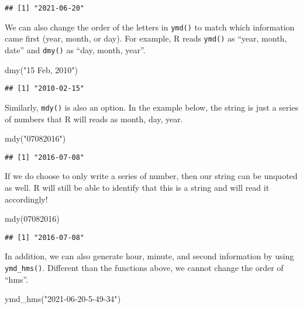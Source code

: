 \documentclass[
]{book}
\newenvironment{Shaded}{\begin{snugshade}}{\end{snugshade}}
\newcommand{\DecValTok}[1]{\textcolor[rgb]{0.00,0.00,0.81}{#1}}
\newcommand{\FunctionTok}[1]{\textcolor[rgb]{0.00,0.00,0.00}{#1}}
\newcommand{\NormalTok}[1]{#1}
\newcommand{\StringTok}[1]{\textcolor[rgb]{0.31,0.60,0.02}{#1}}
\begin{document}
\begin{verbatim}
## [1] "2021-06-20"
\end{verbatim}

We can also change the order of the letters in \texttt{ymd()} to match which information came first (year, month, or day). For example, R reads \texttt{ymd()} as ``year, month, date'' and \texttt{dmy()} as ``day, month, year''.

\begin{Shaded}
\begin{Highlighting}[]
\FunctionTok{dmy}\NormalTok{(}\StringTok{"15 Feb, 2010"}\NormalTok{)}
\end{Highlighting}
\end{Shaded}

\begin{verbatim}
## [1] "2010-02-15"
\end{verbatim}

Similarly, \texttt{mdy()} is also an option. In the example below, the string is just a series of numbers that R will reads as month, day, year.

\begin{Shaded}
\begin{Highlighting}[]
\FunctionTok{mdy}\NormalTok{(}\StringTok{"07082016"}\NormalTok{)}
\end{Highlighting}
\end{Shaded}

\begin{verbatim}
## [1] "2016-07-08"
\end{verbatim}

If we do choose to only write a series of number, then our string can be unquoted as well. R will still be able to identify that this is a string and will read it accordingly!

\begin{Shaded}
\begin{Highlighting}[]
\FunctionTok{mdy}\NormalTok{(}\DecValTok{07082016}\NormalTok{)}
\end{Highlighting}
\end{Shaded}

\begin{verbatim}
## [1] "2016-07-08"
\end{verbatim}

In addition, we can also generate hour, minute, and second information by using \texttt{ymd\_hms()}. Different than the functions above, we cannot change the order of ``hms''.

\begin{Shaded}
\begin{Highlighting}[]
\FunctionTok{ymd\_hms}\NormalTok{(}\StringTok{"2021{-}06{-}20{-}5{-}49{-}34"}\NormalTok{)}
\end{Highlighting}
\end{Shaded}
\end{document}
